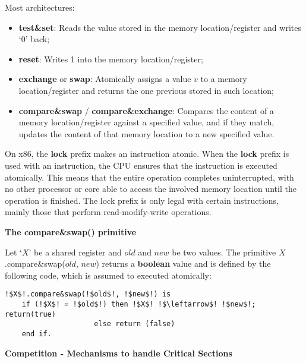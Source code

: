 \par Most architectures:
\begin{itemize}
    \item \textbf{test\&set}: Reads the value stored in the memory location/register and writes ‘0’ back;
    \item \textbf{reset}: Writes 1 into the memory location/register;
    \item \textbf{exchange} or \textbf{swap}: Atomically assigns a value $v$ to a memory location/register and returns the one previous stored in such location;
    \item \textbf{compare\&swap} / \textbf{compare\&exchange}: Compares the content of a memory location/register against a specified value, and if they match, updates the content of that memory location to a new specified value.
\end{itemize}
\par On x86, the \textbf{lock} prefix makes an instruction atomic. When the \textbf{lock} prefix is used with an instruction, the CPU ensures that the instruction is executed atomically. This means that the entire operation completes uninterrupted, with no other processor or core able to access the involved memory location until the operation is finished. The lock prefix is only legal with certain instructions, mainly those that perform read-modify-write operations.
%
\clearpage
%
\par {\large \textbf{The compare\&swap() primitive}}
\par  Let ‘$X$’ be a shared register and $old$ and $new$ be two values. The primitive $X$.compare\&swap($old$, $new$) returns a \textbf{boolean} value and is defined by the following code, which is assumed to executed atomically:
\begin{tcolorbox}[colback=nightblue!5!white, colframe=nightblue!75!black]
    \begin{lstlisting}[label={lst:compareswap1}, morekeywords={is, if, then, else, end}, numbers=none, escapechar=!]
!$X$!.compare&swap(!$old$!, !$new$!) is
    if (!$X$! = !$old$!) then !$X$! !$\leftarrow$! !$new$!; return(true)
                     else return (false)
    end if.\end{lstlisting}
\end{tcolorbox}
\par {\large \textbf{Competition - Mechanisms to handle Critical Sections}}
